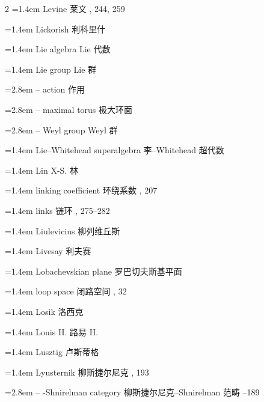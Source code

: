 \begin{multicols}{2}
\noindent\hangindent=1.4em Levine \quad 莱文 , 244, 259\par
\noindent\hangindent=1.4em Lickorish \quad 利科里什 \par
\noindent\hangindent=1.4em Lie algebra \quad Lie 代数 \par
\noindent\hangindent=1.4em Lie group \quad Lie 群 \par
\noindent\hangindent=2.8em -- action \quad 作用 \par
\noindent\hangindent=2.8em -- maximal torus \quad 极大环面 \par
\noindent\hangindent=2.8em -- Weyl group \quad Weyl 群 \par
\noindent\hangindent=1.4em Lie--Whitehead superalgebra \quad 李--Whitehead 超代数 \par
\noindent\hangindent=1.4em Lin X-S. \quad 林 \par
\noindent\hangindent=1.4em linking coefficient \quad 环绕系数 , 207\par
\noindent\hangindent=1.4em links \quad 链环 , 275--282\par
\noindent\hangindent=1.4em Liulevicius \quad 柳列维丘斯 \par
\noindent\hangindent=1.4em Livesay \quad 利夫赛 \par
\noindent\hangindent=1.4em Lobachevskian plane \quad 罗巴切夫斯基平面 \par
\noindent\hangindent=1.4em loop space \quad 闭路空间 , 32\par
\noindent\hangindent=1.4em Losik \quad 洛西克 \par
\noindent\hangindent=1.4em Louis H. \quad 路易 H. \par
\noindent\hangindent=1.4em Lusztig \quad 卢斯蒂格 \par
\noindent\hangindent=1.4em Lyusternik \quad 柳斯捷尔尼克 , 193\par
\noindent\hangindent=2.8em -- -Shnirelman category \quad 柳斯捷尔尼克--Shnirelman 范畴 --189\par
\end{multicols}

